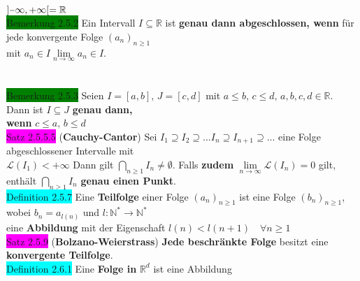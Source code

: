 \documentclass[10pt]{article}
\begin{document}
                $]\scalebox{0.75}[1.0]{\(-\)}\infty,+\infty[=\mathbb{R}$\\
\colorbox{green}{Bemerkung 2.5.2} Ein Intervall $I\subseteq\mathbb{R}$ ist \textbf{genau dann 
                abgeschlossen, wenn} für jede konvergente Folge $(a_n)_{n\geqslant1}$ \\
        \indent mit \textcolor{NavyBlue}{$a_n\in I$\quad$\lim\limits_{n\to\infty}a_n\in I$}.\\
\,\\
\,\\
\colorbox{green}{Bemerkung 2.5.3} Seien $I=[a,b],\,J=[c,d]$ mit 
                \textcolor{NavyBlue}{$a\leqslant b,\,c\leqslant d,\,a,b,c,d\in\mathbb{R}$}. 
                Dann ist 
                \textcolor{NavyBlue}{$I\subseteq J$} \textbf{genau dann, \\
        \indent wenn} \textcolor{NavyBlue}{$c\leqslant a,\,b\leqslant d$}\\
\colorbox{magenta}{Satz 2.5.5.5} (\textbf{Cauchy-Cantor}) Sei 
                \textcolor{NavyBlue}{
                $I_1\supseteq I_2\supseteq ...I_n\supseteq I_{n+1}\supseteq ...$} eine Folge 
                abgeschlossener Intervalle mit \\
        \indent \textcolor{NavyBlue}{$\mathcal{L}(I_1)<+\infty$} Dann gilt 
                \textcolor{NavyBlue}{$\bigcap_{n\geqslant1}I_n\neq\emptyset$}. 
                Falls \textbf{zudem}  
                \textcolor{NavyBlue}{$\lim\limits_{n\to\infty}\mathcal{L}(I_n)=0$} 
                gilt, enthält 
                \textcolor{NavyBlue}{$\bigcap_{n\geqslant1}I_n$} 
                \textbf{genau einen Punkt}.\\
\colorbox{cyan}{Definition 2.5.7} Eine \textbf{Teilfolge} einer Folge 
                \textcolor{NavyBlue}{$(a_n)_{n\geqslant1}$}
                ist eine Folge 
                \textcolor{NavyBlue}{$(b_n)_{n\geqslant1}$}, wobei 
                \textcolor{NavyBlue}{$b_n=a_{l(n)}$} und 
                \textcolor{NavyBlue}{$l:\mathbb{N}^{*}\longrightarrow\mathbb{N}^*$} \\
        \indent eine \textbf{Abbildung} mit der Eigenschaft 
                \textcolor{NavyBlue}{$l(n)<l(n+1)\quad\forall n\geqslant1$}\\
\colorbox{magenta}{Satz 2.5.9} (\textbf{Bolzano-Weierstrass}) \textbf{Jede beschränkte Folge} 
                besitzt eine \textbf{konvergente Teilfolge}.\\
\colorbox{cyan}{Definition 2.6.1} Eine \textbf{Folge in} 
                \textcolor{NavyBlue}{$\mathbb{R}^d$} ist eine Abbildung 
\end{document}
